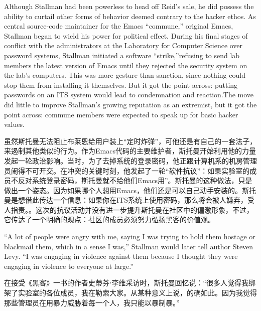 \ifdefined\eng
Although Stallman had been powerless to head off Reid's sale, he did possess the ability to curtail other forms of behavior deemed contrary to the hacker ethos. As central source-code maintainer for the \ifdefined\vone Emacs ``commune,'' \fi\ifdefined\vtwo original Emacs, \fi Stallman began to wield his power for political effect. During his final stages of conflict with the administrators at the Laboratory for Computer Science over password systems, Stallman initiated a software ``strike,''\ifdefined\vone{}\fi  refusing to send lab members the latest version of Emacs until they rejected the security system on the lab's computers.\ifdefined\vtwo{} This was more gesture than sanction, since nothing could stop them from installing it themselves. But it got the point across: putting passwords on an ITS system would lead to condemnation and reaction.\fi\ifdefined\vone  The move did little to improve Stallman's growing reputation as an extremist, but it got the point across: commune members were expected to speak up for basic hacker values.\fi
\fi

\ifdefined\chs
虽然斯托曼无法阻止布莱恩给用户装上``定时炸弹''，可他还是有自己的一套法子，来遏制其他类似的行为。作为Emacs代码的主要维护者，斯托曼开始利用他的力量发起一轮政治影响。当时，为了去掉系统的登录密码，他正跟计算机系的机房管理员闹得不可开交。在冲突的关键时刻，他发起了一轮``软件抗议\ifdefined\vone{}\fi''：如果实验室的成员不反对系统登录密码，斯托曼就不给他们Emacs用\ifdefined\vtwo{}''。斯托曼的这种做法，只是做出一个姿态。因为如果哪个人想用Emacs，他们还是可以自己动手安装的。斯托曼是想借此传达一个信息：如果你在ITS系统上使用密码，那么将会被人嫌弃，受人指责。\fi 。\ifdefined\vone 这次的抗议活动并没有进一步提升斯托曼在社区中的偏激形象，不过，它传达了一个明确的观点：社区的成员必须努力弘扬黑客的价值观。\fi
\fi

\ifdefined\eng
``A lot of people were angry with me, saying I was trying to hold them hostage or blackmail them, which in a sense I was,'' Stallman would later tell author Steven Levy. ``I was engaging in violence against them because I thought they were engaging in violence to everyone at large.''
\fi

\ifdefined\chs
在接受《黑客》一书的作者史蒂芬⋅李维采访时，斯托曼回忆说：``很多人觉得我绑架了实验室的各位成员，我在勒索大家。从某种意义上说，的确如此。因为我觉得那些管理员在用暴力威胁着每一个人，我只能以暴制暴。''
\fi

